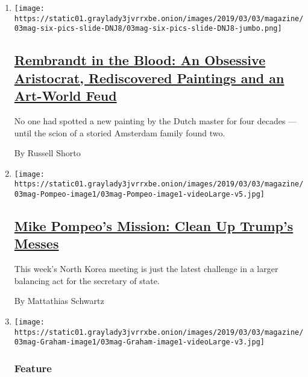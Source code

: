 \begin{enumerate}
\def\labelenumi{\arabic{enumi}.}
\item
  \texttt{[image: https://static01.graylady3jvrrxbe.onion/images/2019/03/03/magazine/03mag-six-pics-slide-DNJ8/03mag-six-pics-slide-DNJ8-jumbo.png]}

  \hypertarget{rembrandt-in-the-blood-an-obsessive-aristocrat-rediscovered-paintings-and-an-art-world-feud}{%
  \subsection{\texorpdfstring{\href{/2019/02/27/magazine/rembrandt-jan-six.html}{Rembrandt
  in the Blood: An Obsessive Aristocrat, Rediscovered Paintings and an
  Art-World
  Feud}}{Rembrandt in the Blood: An Obsessive Aristocrat, Rediscovered Paintings and an Art-World Feud}}\label{rembrandt-in-the-blood-an-obsessive-aristocrat-rediscovered-paintings-and-an-art-world-feud}}

  No one had spotted a new painting by the Dutch master for four decades
  --- until the scion of a storied Amsterdam family found two.

  By Russell Shorto
\item
  \texttt{[image: https://static01.graylady3jvrrxbe.onion/images/2019/03/03/magazine/03mag-Pompeo-image1/03mag-Pompeo-image1-videoLarge-v5.jpg]}

  \hypertarget{mike-pompeos-mission-clean-up-trumps-messes}{%
  \subsection{\texorpdfstring{\href{/2019/02/26/magazine/mike-pompeo-translates-trump.html}{Mike
  Pompeo's Mission: Clean Up Trump's
  Messes}}{Mike Pompeo's Mission: Clean Up Trump's Messes}}\label{mike-pompeos-mission-clean-up-trumps-messes}}

  This week's North Korea meeting is just the latest challenge in a
  larger balancing act for the secretary of state.

  By Mattathias Schwartz
\item
  \texttt{[image: https://static01.graylady3jvrrxbe.onion/images/2019/03/03/magazine/03mag-Graham-image1/03mag-Graham-image1-videoLarge-v3.jpg]}

  \hypertarget{feature}{%
  \subsubsection{Feature}\label{feature}}


\end{enumerate}
